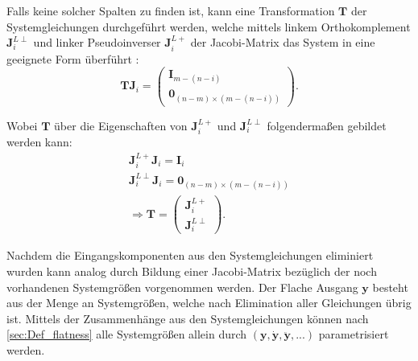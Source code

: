Falls keine solcher Spalten zu finden ist, kann eine Transformation $\mathbf{T}$ der Systemgleichungen durchgeführt werden, welche mittels linkem Orthokomplement $\mathbf{J}_i^{L \perp}$ und linker Pseudoinverser $\mathbf{J}_i^{L +}$ der Jacobi-Matrix das System in eine geeignete Form überführt \cite[Abschnitt 2.1.2]{Fritzsche2016}:
\begin{equation}
	\mathbf{T} \mathbf{J}_i = 
	\begin{pmatrix}
		\mathbf{I}_{m-(n-i)} \\
		\mathbf{0}_{(n-m) \times (m-(n-i))}
	\end{pmatrix}.
\end{equation}

Wobei $\mathbf{T}$ über die Eigenschaften von $\mathbf{J}_i^{L +}$ und  $\mathbf{J}_i^{L \perp}$ folgendermaßen gebildet werden kann:
\begin{align}
	\mathbf{J}_i^{L +} \mathbf{J}_i = \mathbf{I}_i \\
	\mathbf{J}_i^{L \perp} \mathbf{J}_i = \mathbf{0}_{(n-m) \times (m-(n-i))} \\
	\Rightarrow \mathbf{T} = 
	\begin{pmatrix}
		\mathbf{J}_i^{L +} \\
		\mathbf{J}_i^{L \perp}
	\end{pmatrix} .
\end{align}

Nachdem die Eingangskomponenten aus den Systemgleichungen eliminiert wurden kann analog durch Bildung einer Jacobi-Matrix bezüglich der noch vorhandenen Systemgrößen vorgenommen werden. Der Flache Ausgang $\mathbf{y}$ besteht aus der Menge an Systemgrößen, welche nach Elimination aller Gleichungen übrig ist. Mittels der Zusammenhänge aus den Systemgleichungen können nach \ref{sec:Def_flatness} alle Systemgrößen allein durch $(\mathbf{y}, \dot{\mathbf{y}}, \ddot{\mathbf{y}}, ...)$ parametrisiert werden.

